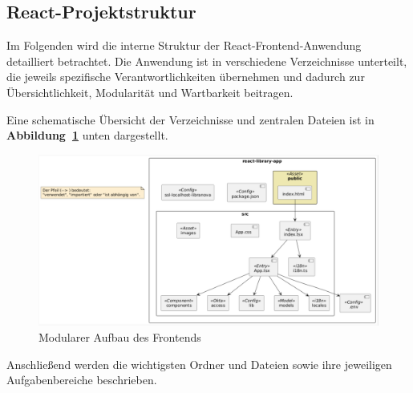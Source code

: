\subsection{React-Projektstruktur}

Im Folgenden wird die interne Struktur der React-Frontend-Anwendung detailliert betrachtet. Die Anwendung ist in verschiedene Verzeichnisse unterteilt, die jeweils spezifische Verantwortlichkeiten übernehmen und dadurch zur Übersichtlichkeit, Modularität und Wartbarkeit beitragen.

\noindent Eine schematische Übersicht der Verzeichnisse und zentralen Dateien ist in \textbf{Abbildung~\ref{fig:folder-structure}} unten dargestellt.
\begin{figure}[H]
	\centering
	\includegraphics[width=1.00\textwidth]{images/frontend_structure.png}
	\caption{Modularer Aufbau des Frontends}
	\label{fig:folder-structure}
\end{figure} 
\noindent Anschließend werden die wichtigsten Ordner und Dateien sowie ihre jeweiligen Aufgabenbereiche beschrieben.
